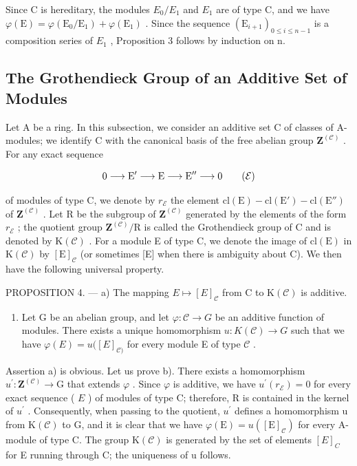 Since C is hereditary, the modules \(E_{0}/E_{1}\) and \(E_{1}\) are of type C, and we have \(\varphi(\mathrm{E}) = \varphi(\mathrm{E}_{0}/\mathrm{E}_{1}) + \varphi(\mathrm{E}_{1})\) . Since the sequence \((\mathrm{E}_{i+1})_{0 \leqslant i \leqslant n-1}\) is a composition series of \(E_{1}\) , Proposition 3 follows by induction on n.

\subsection{The Grothendieck Group of an Additive Set of Modules}

Let A be a ring. In this subsection, we consider an additive set C of classes of A-modules; we identify C with the canonical basis of the free abelian group \(\mathbf{Z}^{(\mathcal{C})}\) . For any exact sequence

\[
0 \longrightarrow \mathrm{E} ^ {\prime} \longrightarrow \mathrm{E} \longrightarrow \mathrm{E} ^ {\prime \prime} \longrightarrow 0\tag{\( \mathcal{E} \)}
\]

of modules of type C, we denote by \(r_{\mathcal{E}}\) the element \(\mathrm{cl}(\mathrm{E}) - \mathrm{cl}(\mathrm{E}') - \mathrm{cl}(\mathrm{E}'')\) of \(\mathbf{Z}^{(\mathcal{C})}\) . Let R be the subgroup of \(\mathbf{Z}^{(\mathcal{C})}\) generated by the elements of the form \(r_{\mathcal{E}}\) ; the quotient group \(\mathbf{Z}^{(\mathcal{C})}/\mathrm{R}\) is called the Grothendieck group of C and is denoted by \(\mathrm{K}(\mathcal{C})\) . For a module E of type C, we denote the image of \(\mathrm{cl}(\mathrm{E})\) in \(\mathrm{K}(\mathcal{C})\) by \([\mathrm{E}]_{\mathcal{C}}\) (or sometimes {[}E{]} when there is ambiguity about C). We then have the following universal property.

PROPOSITION 4. --- a) The mapping \(E \mapsto [E]_{\mathcal{C}}\) from C to \(\mathrm{K}(\mathcal{C})\) is additive.

\begin{enumerate}
\def\labelenumi{\alph{enumi})}
\setcounter{enumi}{1}
\tightlist
\item
  Let G be an abelian group, and let \(\varphi : \mathcal{C} \to G\) be an additive function of modules. There exists a unique homomorphism \(u: K(\mathcal{C}) \to G\) such that we have \(\varphi(E) = u([E]_{\mathcal{C})}\) for every module E of type \(\mathcal{C}\) .
\end{enumerate}

Assertion a) is obvious. Let us prove b). There exists a homomorphism \(u^{\prime}: \mathbf{Z}^{(\mathcal{C})} \to \mathrm{G}\) that extends \(\varphi\) . Since \(\varphi\) is additive, we have \(u^{\prime}(r_{\mathcal{E}}) = 0\) for every exact sequence ( \(E\) ) of modules of type C; therefore, R is contained in the kernel of \(u^{\prime}\) . Consequently, when passing to the quotient, \(u^{\prime}\) defines a homomorphism u from \(\mathrm{K}(\mathcal{C})\) to G, and it is clear that we have \(\varphi(\mathrm{E}) = u([\mathrm{E}]_{\mathcal{C}})\) for every A-module of type C. The group \(\mathrm{K}(\mathcal{C})\) is generated by the set of elements \([E]_{C}\) for E running through C; the uniqueness of u follows.

